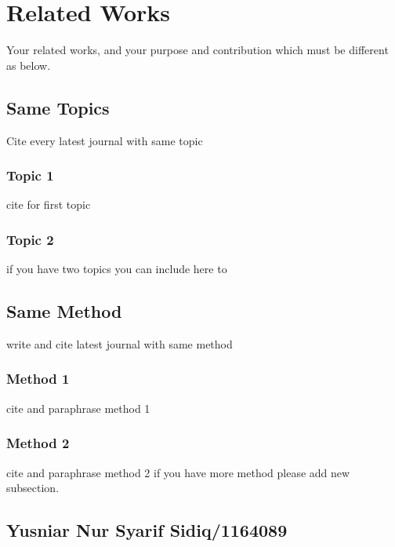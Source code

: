\chapter{Related Works}

Your related works, and your purpose and contribution which must be different as below.

\section{Same Topics}
Cite every latest journal with same topic
\subsection{Topic 1}
cite for first topic

\subsection{Topic 2}
if you have two topics you can include here to


\section{Same Method}
write and cite latest journal with same method

\subsection{Method 1}
cite and paraphrase method 1

\subsection{Method 2}
cite and paraphrase method 2 if you have more method please add new subsection.

\section{Yusniar Nur Syarif Sidiq/1164089}
